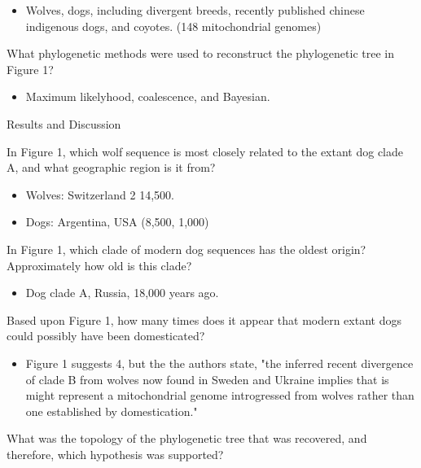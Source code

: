 \documentclass[12pt,a4paper]{article}
\begin{document}
\begin{itemize}
\begin{itemize}
                \begin{itemize}
                    \item Wolves, dogs, including divergent breeds, recently published chinese indigenous dogs, and coyotes. (148 mitochondrial genomes)
                \end{itemize}
            {\color{darklc} \item  What phylogenetic methods were used to reconstruct the phylogenetic tree in Figure 1?}
                \begin{itemize}
                    \item Maximum likelyhood, coalescence, and Bayesian.
                \end{itemize}
        \end{itemize}
    \item Results and Discussion
        \begin{itemize}
            {\color{darklc} \item In Figure 1, which wolf sequence is most closely related to the extant dog clade A, and what geographic region is it from?}
                \begin{itemize}
                    \item Wolves: Switzerland 2 14,500.
                    \item Dogs: Argentina, USA (8,500, 1,000) 
                \end{itemize}
            {\color{darklc} \item In Figure 1, which clade of modern dog sequences has the oldest origin? Approximately how old is this clade?}
                \begin{itemize}
                    \item Dog clade A, Russia, 18,000 years ago.
                \end{itemize}
            {\color{darklc} \item Based upon Figure 1, how many times does it appear that modern extant dogs could possibly have been domesticated?}
                \begin{itemize}
                    \item Figure 1 suggests 4, but the the authors state, {\color{G-Moon}"the inferred recent divergence of clade B from wolves now found in Sweden and Ukraine implies that is might represent a mitochondrial genome introgressed from wolves rather than one established by domestication."}
                \end{itemize}
            {\color{darklc} \item What was the topology of the phylogenetic tree that was recovered, and therefore, which hypothesis was supported?}

\end{itemize}
\end{itemize}
\end{document}
